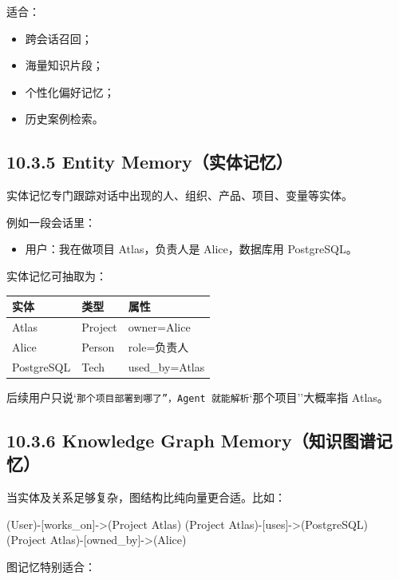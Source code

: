 适合：


\begin{itemize}[leftmargin=2em]
\item 跨会话召回；
\item 海量知识片段；
\item 个性化偏好记忆；
\item 历史案例检索。
\end{itemize}

\subsection{10.3.5 Entity Memory（实体记忆）}

实体记忆专门跟踪对话中出现的人、组织、产品、项目、变量等实体。


例如一段会话里：


\begin{itemize}[leftmargin=2em]
\item 用户：我在做项目 Atlas，负责人是 Alice，数据库用 PostgreSQL。
\end{itemize}

实体记忆可抽取为：


\begingroup
\scriptsize
\setlength{\tabcolsep}{3pt}
\begin{longtable}{|p{}|p{}|p{}|}
\hline
实体 & 类型 & 属性 \\ \hline
Atlas & Project & owner=Alice \\ \hline
Alice & Person & role=负责人 \\ \hline
PostgreSQL & Tech & used\_by=Atlas \\ \hline
\end{longtable}
\endgroup

后续用户只说`\texttt{那个项目部署到哪了''，Agent 就能解析}`那个项目''大概率指 Atlas。


\subsection{10.3.6 Knowledge Graph Memory（知识图谱记忆）}

当实体及关系足够复杂，图结构比纯向量更合适。比如：


\begin{codeblock}
(User)-[works_on]->(Project Atlas)
(Project Atlas)-[uses]->(PostgreSQL)
(Project Atlas)-[owned_by]->(Alice)
\end{codeblock}

图记忆特别适合：


